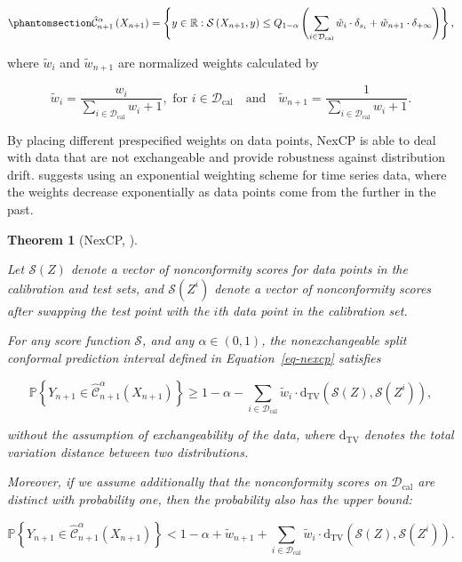 \documentclass[
  11pt,
  a4paper,
]{article}
\theoremstyle{plain}
\theoremstyle{plain}
\newtheorem{theorem}{Theorem}[section]
\theoremstyle{remark}
\begin{document}
\begin{equation}\phantomsection\label{eq-nexcp}{
\hat{\mathcal{C}}_{n+1}^{\alpha}\left(X_{n+1}\right) = \left\{y\in\mathbb{R}: \mathcal{S}\left(X_{n+1}, y\right) \leq Q_{1-\alpha}\left(\sum_{i \in \mathcal{D}_{\text{cal}}}\tilde{w}_i\cdot\delta_{s_{i}}+\tilde{w}_{n+1}\cdot\delta_{+\infty}\right)\right\},
}\end{equation}

where \(\tilde{w}_i\) and \(\tilde{w}_{n+1}\) are normalized weights
calculated by

\[
\tilde{w}_i = \frac{w_i}{\sum_{i\in\mathcal{D}_{\text{cal}}}w_i+1}, \text{ for } i \in \mathcal{D}_{\text{cal}} \quad \text{and} \quad \tilde{w}_{n+1} =  \frac{1}{\sum_{i\in\mathcal{D}_{\text{cal}}}w_i+1}.
\]

By placing different prespecified weights on data points, NexCP is able
to deal with data that are not exchangeable and provide robustness
against distribution drift. \textcite{barber2023} suggests using an
exponential weighting scheme for time series data, where the weights
decrease exponentially as data points come from the further in the past.

\begin{theorem}[NexCP,
\textcite{barber2023}]\protect\hypertarget{thm-nexcp}{}\label{thm-nexcp}

Let \(\mathcal{S}(Z)\) denote a vector of nonconformity scores for data
points in the calibration and test sets, and \(\mathcal{S}(Z^i)\) denote
a vector of nonconformity scores after swapping the test point with the
\(i\)th data point in the calibration set.

For any score function \(\mathcal{S}\), and any \(\alpha\in(0,1)\), the
nonexchangeable split conformal prediction interval defined in
Equation~\ref{eq-nexcp} satisfies

\[
\mathbb{P}\left\{Y_{n+1} \in \hat{\mathcal{C}}_{n+1}^{\alpha}\left(X_{n+1}\right)\right\} \geq 1-\alpha-\sum_{i \in \mathcal{D}_{\text{cal}}} \tilde{w}_i \cdot \mathrm{d}_{\mathrm{TV}}\left(\mathcal{S}(Z), \mathcal{S}\left(Z^i\right)\right),
\]

without the assumption of exchangeability of the data, where
\(\mathrm{d}_{\mathrm{TV}}\) denotes the total variation distance
between two distributions.

Moreover, if we assume additionally that the nonconformity scores on
\(\mathcal{D}_{\text{cal}}\) are distinct with probability one, then the
probability also has the upper bound:

\[
\mathbb{P}\left\{Y_{n+1} \in \hat{\mathcal{C}}_{n+1}^{\alpha}\left(X_{n+1}\right)\right\} < 1-\alpha+\tilde{w}_{n+1}+\sum_{i \in \mathcal{D}_{\text{cal}}} \tilde{w}_i \cdot \mathrm{d}_{\mathrm{TV}}\left(\mathcal{S}(Z), \mathcal{S}\left(Z^i\right)\right).
\]

\end{theorem}
\end{document}
